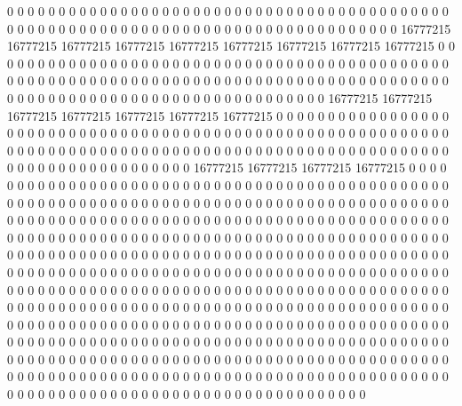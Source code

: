 0 0 0 0 0 0 0 0 0 0 0 0 0 0 0 0 0 0 0 0 0 0 0 0 0 0 0 0 0 0 0 0 0 0 0 0 0 0 0 0 0 0 0 0 0 0 0 0 0 0 0 0 0 0 0 0 0 0 0 0 0 0 0 0 0 0 0 0 0 0 0 0 0 0 0 0 0 0 0 0 0 16777215 16777215 16777215 16777215 16777215 16777215 16777215 16777215 16777215 0 0 0 0 0 0 0 0 0 0 0 0 0 0 0 0 0 0 0 0 0 0 0 0 0 0 0 0 0 0 0 0 0 0 0 0 0 0
0 0 0 0 0 0 0 0 0 0 0 0 0 0 0 0 0 0 0 0 0 0 0 0 0 0 0 0 0 0 0 0 0 0 0 0 0 0 0 0 0 0 0 0 0 0 0 0 0 0 0 0 0 0 0 0 0 0 0 0 0 0 0 0 0 0 0 0 0 0 0 0 0 0 0 0 0 0 0 0 0 16777215 16777215 16777215 16777215 16777215 16777215 16777215 0 0 0 0 0 0 0 0 0 0 0 0 0 0 0 0 0 0 0 0 0 0 0 0 0 0 0 0 0 0 0 0 0 0 0 0 0 0 0 0
0 0 0 0 0 0 0 0 0 0 0 0 0 0 0 0 0 0 0 0 0 0 0 0 0 0 0 0 0 0 0 0 0 0 0 0 0 0 0 0 0 0 0 0 0 0 0 0 0 0 0 0 0 0 0 0 0 0 0 0 0 0 0 0 0 0 0 0 0 0 0 0 0 0 0 0 0 0 0 0 0 16777215 16777215 16777215 16777215 0 0 0 0 0 0 0 0 0 0 0 0 0 0 0 0 0 0 0 0 0 0 0 0 0 0 0 0 0 0 0 0 0 0 0 0 0 0 0 0 0 0 0
0 0 0 0 0 0 0 0 0 0 0 0 0 0 0 0 0 0 0 0 0 0 0 0 0 0 0 0 0 0 0 0 0 0 0 0 0 0 0 0 0 0 0 0 0 0 0 0 0 0 0 0 0 0 0 0 0 0 0 0 0 0 0 0 0 0 0 0 0 0 0 0 0 0 0 0 0 0 0 0 0 0 0 0 0 0 0 0 0 0 0 0 0 0 0 0 0 0 0 0 0 0 0 0 0 0 0 0 0 0 0 0 0 0 0 0 0 0 0 0 0 0 0 0 0 0 0 0
0 0 0 0 0 0 0 0 0 0 0 0 0 0 0 0 0 0 0 0 0 0 0 0 0 0 0 0 0 0 0 0 0 0 0 0 0 0 0 0 0 0 0 0 0 0 0 0 0 0 0 0 0 0 0 0 0 0 0 0 0 0 0 0 0 0 0 0 0 0 0 0 0 0 0 0 0 0 0 0 0 0 0 0 0 0 0 0 0 0 0 0 0 0 0 0 0 0 0 0 0 0 0 0 0 0 0 0 0 0 0 0 0 0 0 0 0 0 0 0 0 0 0 0 0 0 0 0
0 0 0 0 0 0 0 0 0 0 0 0 0 0 0 0 0 0 0 0 0 0 0 0 0 0 0 0 0 0 0 0 0 0 0 0 0 0 0 0 0 0 0 0 0 0 0 0 0 0 0 0 0 0 0 0 0 0 0 0 0 0 0 0 0 0 0 0 0 0 0 0 0 0 0 0 0 0 0 0 0 0 0 0 0 0 0 0 0 0 0 0 0 0 0 0 0 0 0 0 0 0 0 0 0 0 0 0 0 0 0 0 0 0 0 0 0 0 0 0 0 0 0 0 0 0 0 0
0 0 0 0 0 0 0 0 0 0 0 0 0 0 0 0 0 0 0 0 0 0 0 0 0 0 0 0 0 0 0 0 0 0 0 0 0 0 0 0 0 0 0 0 0 0 0 0 0 0 0 0 0 0 0 0 0 0 0 0 0 0 0 0 0 0 0 0 0 0 0 0 0 0 0 0 0 0 0 0 0 0 0 0 0 0 0 0 0 0 0 0 0 0 0 0 0 0 0 0 0 0 0 0 0 0 0 0 0 0 0 0 0 0 0 0 0 0 0 0 0 0 0 0 0 0 0 0
